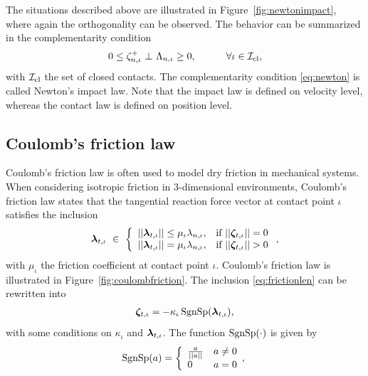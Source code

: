 \documentclass[../DC2017114Bouma.tex]{subfiles}
\begin{document}
The situations described above are illustrated in Figure~\ref{fig:newtonimpact}, where again the orthogonality can be observed. The behavior can be summarized in the complementarity condition
\begin{align}
0\leq \zeta^+_{n,\iota}\ \bot\ \Lambda_{n,\iota} \geq 0,\quad  \qquad \forall \iota\in\mathcal{I}_{\text{cl}},\label{eq:newton}
\end{align}
with $\mathcal{I}_{\text{cl}}$ the set of closed contacts. The complementarity condition \eqref{eq:newton} is called Newton's impact law. Note that the impact law is defined on velocity level, whereas the contact law is defined on position level.

\subsection{Coulomb's friction law}\label{sec:2fric}
Coulomb's friction law is often used to model dry friction in mechanical systems. When considering isotropic friction in 3-dimensional environments, Coulomb's friction law states that the tangential reaction force vector at contact point $\iota$ satisfies the inclusion
\begin{align}
\lambdab_{t,\iota}\ \in\ \left\{ \begin{array}{ll}
||\lambdab_{t,\iota}||\leq\mu_{\iota}\lambda_{n,\iota}, &\text{if }||\zetab_{t,\iota}||=0\\
||\lambdab_{t,\iota}|| = \mu_{\iota}\lambda_{n,\iota}, &\text{if }||\zetab_{t,\iota}||>0
\end{array}\right.,\label{eq:frictionlen}
\end{align}
%
with $\mu_{\iota}$ the friction coefficient at contact point $\iota$. Coulomb's friction law is illustrated in Figure~\ref{fig:coulombfriction}. The inclusion \eqref{eq:frictionlen} can be rewritten into
\begin{align}
\boldsymbol{\zeta}_{t,\iota} = -\kappa_{\iota}\operatorname{\text{SgnSp}}(\boldsymbol{\lambda}_{t,\iota}),\label{eq:frictiondir}
\end{align}
%
with some conditions on $\kappa_{\iota}$ and $\boldsymbol{\lambda}_{t,\iota}$. The function $\operatorname{\text{SgnSp}}(\cdot)$ is given by 
\begin{equation}
\operatorname{\text{SgnSp}}(a) = \left\lbrace\begin{array}{ll}
\frac{a}{||a||} & a \neq 0\\
0 & a = 0
\end{array},\right.
\end{equation}
\end{document}
